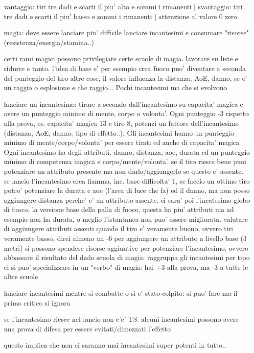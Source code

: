 \documentclass[12pt,a4paper,twoside,openany]{book}
\begin{document}
vantaggio: tiri tre dadi e scarti il piu' alto e sommi i rimanenti  |  svantaggio: tiri tre dadi e scarti il piu' basso e sommi i rimanenti | attenzione al valore 0 zero.

magia: deve essere lanciare piu' difficile lanciare incantesimi e consumare "risorse" (resistenza/energia/stamina..)

certi rami magici possono privilegiare certe scuole di magia. lavorare su liste e ridurre e tanto. l'idea di base e' per esempio crea fuoco puo' diventare a seconda del punteggio del tiro altre cose, il valore influenza la distanza, AoE, danno, se e' un raggio o esplosione e che raggio...  Pochi incantesimi ma che si evolvono

lanciare un incantesimo: tirare a secondo dall'incantesimo su capacita' magica e avere un punteggio minimo di  mente, corpo o volonta'.  Ogni punteggio -3 rispetto alla prova, es. capacita' magica 13 e tiro 8, potenzi un fattore dell'incantesimo (distanza, AoE, danno, tipo di effetto..). Gli incantesimi hanno un punteggio minimo di mente/corpo/volonta' per essere tirati ed anche di capacita' magica
Ogni incantesimo ha degli attributi, danno, distanza, aoe, durata ed un punteggio minimo di competenza magica e corpo/mente/volonta'. se il tiro riesce bene puoi potenziare un attributo presente ma non darlo/aggiungerlo se questo e' assente. se lancio l'incantesimo crea fiamma, inc. base difficolta' 1, se faccio un ottimo tiro potro' potenziare la durata e aoe (l'area di luce che fa) ed il danno, ma non posso aggiungere distanza perche' e' un attributo assente.
ci sara' poi l'incatesimo globo di fuoco, la versione base della palla di fuoco, questa ha piu' attributi ma ad esempio non ha durata, o meglio l'istantanea non puo' essere migliorata.
valutare di aggiungere attributi assenti quando il tiro e' veramente buono, ovvero tiri veramente basso, direi almeno un -6 per aggiungere un attributo a livello base (3 metri)
si possono spendere risorse aggiuntive per potenziare l'incantesimo, ovvero abbassare il risultato del dado
scuola di magia: raggruppa gli incantesimi per tipo
ci si puo' specializzare in un "verbo" di magia: hai +3 alla prova, ma -3 a tutte le altre scuole

lanciare incantesimi mentre si combatte o si e' stato colpito: si puo' fare ma il primo critico si ignora

se l'incantesimo riesce nel lancio non c'e' TS. alcuni incantesimi possono avere una prova di difesa per essere evitati/dimezzati l'effetto

questo implica che non ci saranno mai incantesimi super potenti in tutto..
\end{document}
